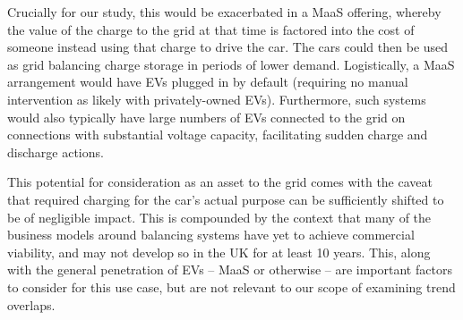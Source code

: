 \documentclass[b5paper,10pt]{article}
\begin{document}
Crucially for our study, this would be exacerbated in a MaaS offering,
whereby the value of the charge to the grid at that time is factored
into the cost of someone instead using that charge to drive the
car. The cars could then be used as grid balancing charge storage in
periods of lower demand. Logistically, a MaaS arrangement would have
EVs plugged in by default (requiring no manual intervention as likely
with privately-owned EVs). Furthermore, such systems would also
typically have large numbers of EVs connected to the grid on
connections with substantial voltage capacity, facilitating sudden
charge and discharge actions.

This potential for consideration as an asset to the grid comes with
the caveat that required charging for the car's actual purpose can be
sufficiently shifted to be of negligible impact. This is compounded by
the context that many of the business models around balancing systems
have yet to achieve commercial viability, and may not develop so in
the UK for at least 10 years. This, along with the general penetration
of EVs -- MaaS or otherwise -- are important factors to consider for
this use case, but are not relevant to our scope of examining trend
overlaps.





\end{document}
